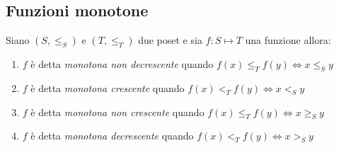 \subsection{Funzioni monotone}
\begin{defi}
    Siano $(S,\leq _S)$ e $(T,\leq _T)$ due poset e sia $f:S \mapsto T$ una funzione allora:
\end{defi}
\begin{enumerate}
    \item $f$ è detta \emph{monotona non decrescente} quando $f(x) \leq_T f(y) \iff x \leq_S y$
    \item $f$ è detta \emph{monotona crescente} quando $f(x) <_T f(y) \iff x <_S y$
    \item $f$ è detta \emph{monotona non crescente} quando $f(x) \leq_T f(y) \iff x \geq_S y$
    \item $f$ è detta \emph{monotona decrescente} quando $f(x) <_T f(y) \iff x >_S y$
\end{enumerate}
